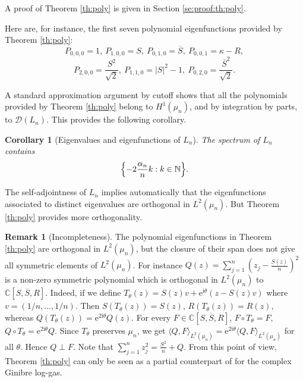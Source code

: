 \documentclass[11pt,reqno]{amsart}
\numberwithin{equation}{section}%
\numberwithin{figure}{section}%
\numberwithin{table}{section}
\theoremstyle{plain}
\newtheorem{corollary}[theorem]{Corollary}
\theoremstyle{definition}
\newtheorem{remark}[theorem]{Remark}
\begin{document}
A proof of Theorem \ref{th:poly} is given in Section \ref{se:proof:th:poly}.

Here are, for instance, the first seven polynomial eigenfunctions provided by Theorem \ref{th:poly}:
\begin{equation}
  P_{0,0,0}=1,\ %
  P_{1,0,0}=S,\ %
  P_{0,1,0}=\overline{S},\ %
  P_{0,0,1}=\kappa-R,%
\end{equation}
\begin{equation}
  P_{2,0,0}=\frac{S^2}{\sqrt{2}},\ %
  P_{1,1,0}=|S|^2-1,\ %
  P_{0,2,0}=\frac{\overline{S}^2}{\sqrt{2}}.
\end{equation}

A standard approximation argument by cutoff shows that all the polynomials
provided by Theorem \ref{th:poly} belong to $H^1(\mu_n)$, and by integration
by parts, to $\mathcal{D}(L_n)$. This provides the following corollary.

\begin{corollary}[Eigenvalues and eigenfunctions of $L_n$]
  The spectrum of $L_n$ contains
  \begin{equation}
    \Bigl\{-2\frac{\alpha_n}{n}k:k\in\mathbb{N}\Bigr\}.
  \end{equation}
\end{corollary}

The self-adjointness of $L_n$ implies automatically that the eigenfunctions
associated to distinct eigenvalues are orthogonal in $L^2(\mu_n)$. But Theorem
\ref{th:poly} provides more orthogonality.

\begin{remark}[Incompleteness]
  The polynomial eigenfunctions in Theorem \ref{th:poly} are orthogonal in
  $L^2(\mu_n)$, but the closure of their span does not give all symmetric
  elements of $L^2(\mu_n)$. For instance
  $Q(z)=\sum_{j=1}^n(z_j-\frac{S(z)}{n})^2$ is a non-zero symmetric polynomial
  which is orthogonal in $L^2(\mu_n)$ to $\mathbb{C}[S,\overline{S},R]$.
  Indeed, if we define
  $T_\theta(z)=S(z)v+\mathrm{e}^{\mathrm{i}\theta}(z-S(z)v)$ where
  $v=(1/n,\ldots,1/n)$. Then $S(T_\theta(z))=S(z)$, $R(T_\theta(z))=R(z)$,
  whereas $Q(T_\theta(z))=\mathrm{e}^{2\mathrm{i}\theta}Q(z)$. For every
  $F\in\mathbb{C}[S,\overline{S},R]$, $F\circ T_\theta=F$,
  $Q\circ T_\theta=\mathrm{e}^{2\mathrm{i}\theta}Q$. Since $T_\theta$
  preserves $\mu_n$, we get
  $\langle Q,F\rangle_{L^2(\mu_n)}=\mathrm{e}^{2\mathrm{i}\theta}\langle
  Q,F\rangle_{L^2(\mu_n)}$ for all $\theta$. Hence $Q\perp F$. Note that
  $\sum_{j=1}^nz_j^2=\frac{S^2}{n}+Q$. From this point of view, Theorem
  \ref{th:poly} can only be seen as a partial counterpart of
  \cite{LassalleHermite,LassalleLaguerre} for the complex Ginibre log-gas.
\end{remark}
\end{document}
